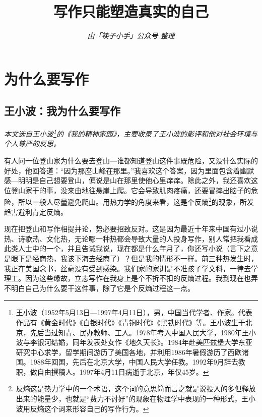 \documentclass[fontset=fandol,12pt,a5paper]{ctexbook}
\title{\Huge{\textbf{写作只能塑造真实的自己}}}
\author{\small{\emph{由「筷子小手」公众号 \space{} 整理}}}
\date{}
\begin{document}
\maketitle %

\thispagestyle{empty} %
\newpage

\thispagestyle{empty}
\tableofcontents %
\newpage


\pagestyle{plain}
\setcounter{page}{1} %

\chapter{为什么要写作}

\section{王小波：我为什么要写作}


\emph{本文选自王小波\footnote{王小波（1952年5月13日—1997年4月11日），男，中国当代学者、作家。代表作品有《黄金时代》《白银时代》《青铜时代》《黑铁时代》等。王小波生于北京，先后当过知青、民办教师、工人。1978年考入中国人民大学，1980年王小波与李银河结婚，同年发表处女作《地久天长》。1984年赴美匹兹堡大学东亚研究中心求学，留学期间游历了美国各地，并利用1986年暑假游历了西欧诸国。1988年回国，先后在北京大学，中国人民大学任教。1992年9月辞去教职，做自由撰稿人。1997年4月11日病逝于北京，年仅45岁。}的《我的精神家园》，主要收录了王小波的影评和他对社会环境与个人尊严的反思。}

\vspace{2em}

有人问一位登山家为什么要去登山—谁都知道登山这件事既危险，又没什么实际的好处，他回答道：“因为那座山峰在那里。”我喜欢这个答案，因为里面包含着幽默感—明明是自己想要登山，偏说是山在那里使他心里痒痒。除此之外，我还喜欢这位登山家干的事，没来由地往悬崖上爬。它会导致肌肉疼痛，还要冒摔出脑子的危险，所以一般人尽量避免爬山。用热力学的角度来看，这是个反熵\footnote{反熵这是热力学中的一个术语，这个词的意思简而言之就是说投入的多但释放出来的能量少，也就是“费力不讨好”的现象在物理学中表现的一种形式，王小波用反熵这个词来形容自己的写作行为。}的现象，所发趋害避利肯定反熵。

现在把登山和写作相提并论，势必要招致反对。这是因为最近十年来中国有过小说热、诗歌热、文化热，无论哪一种热都会导致大量的人投身写作，别人常把我看成此类人士中的一个，并且告诫我说，现在都是什么年月了，你还写小说（言下之意是眼下是经商热，我该下海去经商了）？但是我的情形不一样。前三种热发生时，我正在美国念书，丝毫没有受到感染。我们家的家训是不准孩子学文科，一律去学理工。因为这些缘故，立志写作在我身上是个不折不扣的反熵过程。我到现在也弄不明白自己为什么要干这件事，除了它是个反熵过程这一点。
\end{document}
